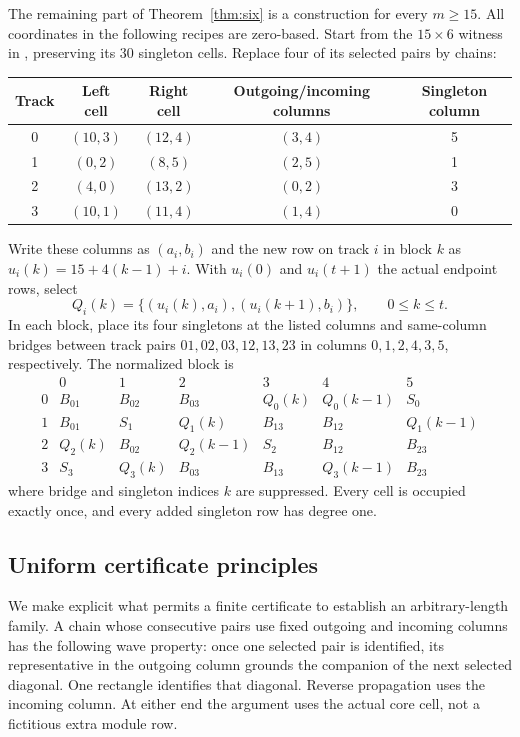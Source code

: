 \documentclass[11pt,a4paper]{article}
\theoremstyle{definition}
\begin{document}
The remaining part of Theorem~\ref{thm:six} is a construction for every
$m\ge15$. All coordinates in the following recipes are zero-based.
Start from the $15\times6$ witness in \cite[Figure~4]{CCQ}, preserving
its 30 singleton cells. Replace four of its selected pairs by chains:
\begin{center}
\begin{tabular}{ccccc}
\toprule
Track&Left cell&Right cell&Outgoing/incoming columns&Singleton column\\
\midrule
0&$(10,3)$&$(12,4)$&$(3,4)$&5\\
1&$(0,2)$&$(8,5)$&$(2,5)$&1\\
2&$(4,0)$&$(13,2)$&$(0,2)$&3\\
3&$(10,1)$&$(11,4)$&$(1,4)$&0\\
\bottomrule
\end{tabular}
\end{center}
Write these columns as $(a_i,b_i)$ and the new row on track $i$ in
block $k$ as $u_i(k)=15+4(k-1)+i$. With $u_i(0)$ and $u_i(t+1)$
the actual endpoint rows, select
\begin{equation}\label{eq:sixchain}
 Q_i(k)=\{(u_i(k),a_i),(u_i(k+1),b_i)\},\qquad0\le k\le t.
\end{equation}
In each block, place its four singletons at the listed columns and
same-column bridges between track pairs $01,02,03,12,13,23$ in
columns $0,1,2,4,3,5$, respectively. The normalized block is
\begin{equation}\label{eq:sixblock}
\begin{array}{c|cccccc}
 &0&1&2&3&4&5\\\hline
0&B_{01}&B_{02}&B_{03}&Q_0(k)&Q_0(k-1)&S_0\\
1&B_{01}&S_1&Q_1(k)&B_{13}&B_{12}&Q_1(k-1)\\
2&Q_2(k)&B_{02}&Q_2(k-1)&S_2&B_{12}&B_{23}\\
3&S_3&Q_3(k)&B_{03}&B_{13}&Q_3(k-1)&B_{23}
\end{array}
\end{equation}
where bridge and singleton indices $k$ are suppressed. Every cell is
occupied exactly once, and every added singleton row has degree one.

\subsection{Uniform certificate principles}\label{sec:certificate-principles}

We make explicit what permits a finite certificate to establish an
arbitrary-length family. A chain whose consecutive pairs use fixed
outgoing and incoming columns has the following wave property: once
one selected pair is identified, its representative in the outgoing
column grounds the companion of the next selected diagonal. One
rectangle identifies that diagonal. Reverse propagation uses the
incoming column. At either end the argument uses the actual core cell,
not a fictitious extra module row.
\end{document}
